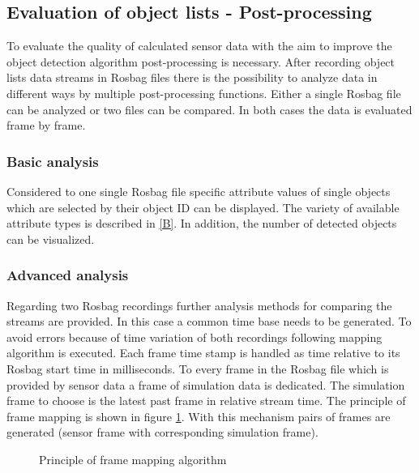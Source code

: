 \subsection{Evaluation of object lists - Post-processing}
To evaluate the quality of calculated sensor data with the aim to improve the object detection algorithm post-processing is necessary.
After recording object lists data streams in Rosbag files there is the possibility to analyze data in different ways by multiple post-processing functions. 
Either a single Rosbag file can be analyzed or two files can be compared. In both cases the data is evaluated frame by frame. 

\subsubsection{Basic analysis}

Considered to one single Rosbag file specific attribute values of single objects which are selected by their object \ac{ID} can be displayed. The variety of available attribute types is described in \cref{B}. In addition, the number of detected objects can be visualized. \\

\subsubsection{Advanced analysis}
\label{sssec:eval}

Regarding two Rosbag recordings further analysis methods for comparing the streams are provided. In this case a common time base needs to be generated. To avoid errors because of time variation of both recordings following mapping algorithm is executed. Each frame time stamp is handled as time relative to its Rosbag start time in milliseconds. To every frame in the Rosbag file which is provided by sensor data a frame of simulation data is dedicated. The simulation frame to choose is the latest past frame in relative stream time. The principle of frame mapping is shown in figure \ref{fig:frame_mapping}. With this mechanism pairs of frames are generated (sensor frame with corresponding simulation frame).

\begin{figure}[t]
	\centering
	\caption{Principle of frame mapping algorithm}
	\label{fig:frame_mapping}
\end{figure}


